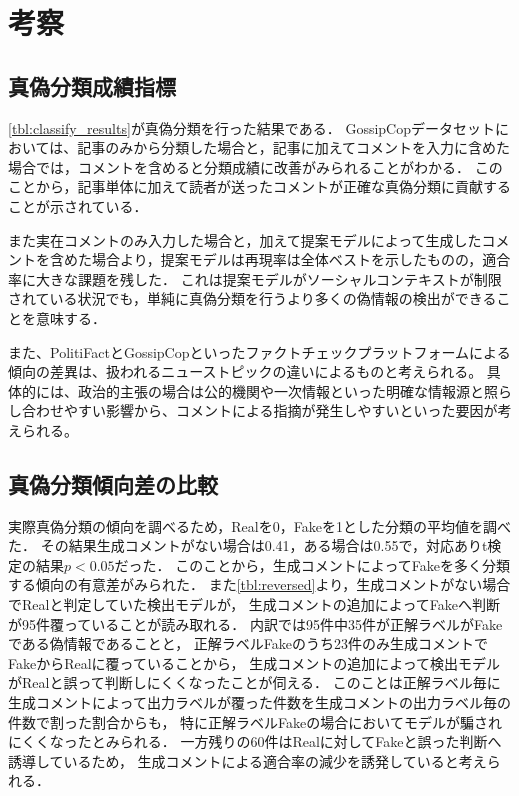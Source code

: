 \section{考察}\label{sec:gen_evl}
\subsection{真偽分類成績指標}
\label{sec:classify_index}
\cref{tbl:classify_results}が真偽分類を行った結果である．
GossipCopデータセットにおいては、記事のみから分類した場合と，記事に加えてコメントを入力に含めた場合では，コメントを含めると分類成績に改善がみられることがわかる．
このことから，記事単体に加えて読者が送ったコメントが正確な真偽分類に貢献することが示されている．

また実在コメントのみ入力した場合と，加えて提案モデルによって生成したコメントを含めた場合より，提案モデルは再現率は全体ベストを示したものの，適合率に大きな課題を残した．
これは提案モデルがソーシャルコンテキストが制限されている状況でも，単純に真偽分類を行うより多くの偽情報の検出ができることを意味する．

また、PolitiFactとGossipCopといったファクトチェックプラットフォームによる傾向の差異は、扱われるニューストピックの違いによるものと考えられる。
具体的には、政治的主張の場合は公的機関や一次情報といった明確な情報源と照らし合わせやすい影響から、コメントによる指摘が発生しやすいといった要因が考えられる。

\subsection{真偽分類傾向差の比較}
\label{sec:classify_trend}
実際真偽分類の傾向を調べるため，Realを0，Fakeを1とした分類の平均値を調べた．
その結果生成コメントがない場合は0.41，ある場合は0.55で，対応ありt検定の結果$p<0.05$だった．
このことから，生成コメントによってFakeを多く分類する傾向の有意差がみられた．
また\cref{tbl:reversed}より，生成コメントがない場合でRealと判定していた検出モデルが，
生成コメントの追加によってFakeへ判断が95件覆っていることが読み取れる．
内訳では95件中35件が正解ラベルがFakeである偽情報であることと，
正解ラベルFakeのうち23件のみ生成コメントでFakeからRealに覆っていることから，
生成コメントの追加によって検出モデルがRealと誤って判断しにくくなったことが伺える．
このことは正解ラベル毎に生成コメントによって出力ラベルが覆った件数を生成コメントの出力ラベル毎の件数で割った割合からも，
特に正解ラベルFakeの場合においてモデルが騙されにくくなったとみられる．
一方残りの60件はRealに対してFakeと誤った判断へ誘導しているため，
生成コメントによる適合率の減少を誘発していると考えられる．

